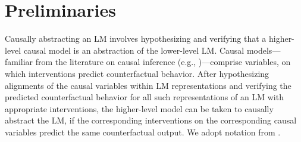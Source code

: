 \section{Preliminaries}


Causally abstracting an LM involves hypothesizing and verifying that a higher-level causal model is an abstraction of the lower-level LM. Causal models---familiar from the literature on causal inference (e.g., \citealt{pearl2009causality})---comprise variables, on which interventions predict counterfactual behavior. After hypothesizing alignments of the causal variables within LM representations and verifying the predicted counterfactual behavior for all such representations of an LM with appropriate interventions, the higher-level model can be taken to causally abstract the LM, if the corresponding interventions on the corresponding causal variables predict the same counterfactual output. We adopt notation from \cite{geiger2023causal}.



